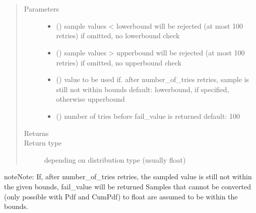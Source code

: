 \documentclass[letterpaper,10pt,english]{sphinxmanual}
\begin{document}
\begin{fulllineitems}
\label{\detokenize{Reference:salabim._Distribution}}~

\begin{fulllineitems}
\label{\detokenize{Reference:salabim._Distribution.bounded_sample}}~\begin{quote}\begin{description}
\item[{Parameters}] \leavevmode\begin{itemize}
\item {} 
 () \textendash{} sample values \textless{} lowerbound will be rejected (at most 100 retries) 
if omitted, no lowerbound check

\item {} 
 () \textendash{} sample values \textgreater{} upperbound will be rejected (at most 100 retries) 
if omitted, no upperbound check

\item {} 
 () \textendash{} value to be used if. after number\_of\_tries retries, sample is still not within bounds 
default: lowerbound, if specified, otherwise upperbound

\item {} 
 () \textendash{} number of tries before fail\_value is returned 
default: 100

\end{itemize}

\item[{Returns}] \leavevmode
{}

\item[{Return type}] \leavevmode
depending on distribution type (usually float)

\end{description}\end{quote}

\begin{sphinxadmonition}{note}{Note:}
If, after number\_of\_tries retries, the sampled value is still not within the given bounds,
fail\_value  will be returned 
Samples that cannot be converted (only possible with Pdf and CumPdf) to float
are assumed to be within the bounds.
\end{sphinxadmonition}

\end{fulllineitems}


\end{fulllineitems}
\end{document}
